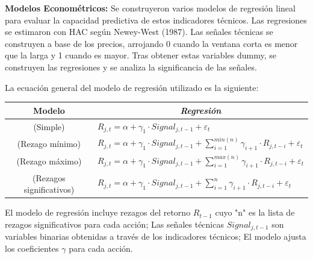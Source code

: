 \documentclass[a0,portrait]{a0poster}
\begin{document}
\begin{multicols}{2}
\begin{minipage}{.984\linewidth}
    \end{minipage}
    \par
    \textbf{Modelos Econométricos:} Se construyeron varios modelos de regresión lineal para evaluar la capacidad predictiva de 
    estos indicadores técnicos. Las regresiones se estimaron con HAC según Newey-West (1987). Las señales técnicas se construyen 
    a base de los precios, arrojando 0 cuando la ventana corta es menor que la larga y 1 cuando es mayor. Tras obtener estas 
    variables dummy, se construyen las regresiones y se analiza la significancia de 
    las señales. 
    
    La ecuación general del modelo de regresión utilizado es la siguiente:

\begin{minipage}{.95\linewidth}
    \centering
    \vspace{1cm}
    \begin{tabular}{cl}
        \toprule

        \textbf{Modelo} & \multicolumn{1}{c}{\textbf{\textit{Regresión}}}   \\
        \midrule
        (Simple) & $R_{j,t} = \alpha + \gamma_1 \cdot Signal_{j,t-1}+\varepsilon_t$ \\
        (Rezago mínimo) & $R_{j,t} = \alpha + \gamma_1 \cdot Signal_{j,t-1} + \sum_{i=1}^{min(n)}  \gamma_{i+1} \cdot R_{j,t-i} +\varepsilon_t$ \\
        (Rezago máximo) & $R_{j,t} = \alpha + \gamma_1 \cdot Signal_{j,t-1} + \sum_{i=1}^{max(n)}  \gamma_{i+1} \cdot R_{j,t-i} +\varepsilon_t$ \\
        (Rezagos significativos) & $R_{j,t} = \alpha + \gamma_1 \cdot Signal_{j,t-1} + \sum_{i=1}^{n}  \gamma_{i+1} \cdot R_{j,t-i} +\varepsilon_t$ \\
        \bottomrule
    \end{tabular}
    \vspace{.3cm}
    \captionsetup{width=0.8\textwidth}  %
    \caption*{\footnotesize El modelo de regresión incluye rezagos del retorno \( R_{t-1}\)
    cuyo "n" es la lista de rezagos significativos para cada acción; Las señales técnicas \(Signal_{j,t-1}\) 
    son variables binarias obtenidas a través de los indicadores técnicos; El modelo ajusta los coeficientes $\gamma$ para cada acción.    }  %
    \vspace{.5cm}
    \end{minipage}
       

\end{multicols}
\end{document}
